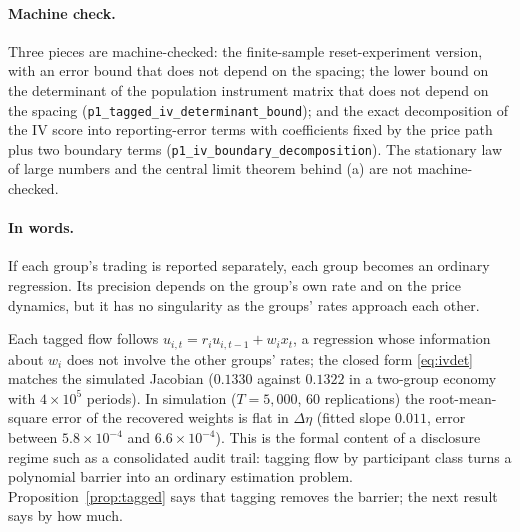 \documentclass[12pt]{article}
\theoremstyle{definition}
\theoremstyle{remark}
\begin{document}
\paragraph{Machine check.} Three pieces are machine-checked: the finite-sample reset-experiment version, with an error bound that does not depend on the spacing; the lower bound on the determinant of the population instrument matrix that does not depend on the spacing (\texttt{p1\_tagged\_iv\_determinant\_bound}); and the exact decomposition of the IV score into reporting-error terms with coefficients fixed by the price path plus two boundary terms (\texttt{p1\_iv\_boundary\_decomposition}). The stationary law of large numbers and the central limit theorem behind (a) are not machine-checked.

\paragraph{In words.} If each group's trading is reported separately, each group becomes an ordinary regression. Its precision depends on the group's own rate and on the price dynamics, but it has no singularity as the groups' rates approach each other.


Each tagged flow follows $u_{i,t}=r_iu_{i,t-1}+w_ix_t$, a regression whose information about $w_i$ does not involve the other groups' rates; the closed form \eqref{eq:ivdet} matches the simulated Jacobian ($0.1330$ against $0.1322$ in a two-group economy with $4\times10^5$ periods). In simulation ($T=5{,}000$, 60 replications) the root-mean-square error of the recovered weights is flat in $\Delta\eta$ (fitted slope $0.011$, error between $5.8\times10^{-4}$ and $6.6\times10^{-4}$). This is the formal content of a disclosure regime such as a consolidated audit trail: tagging flow by participant class turns a polynomial barrier into an ordinary estimation problem.
Proposition~\ref{prop:tagged} says that tagging removes the barrier; the next result says by how much.
\end{document}
